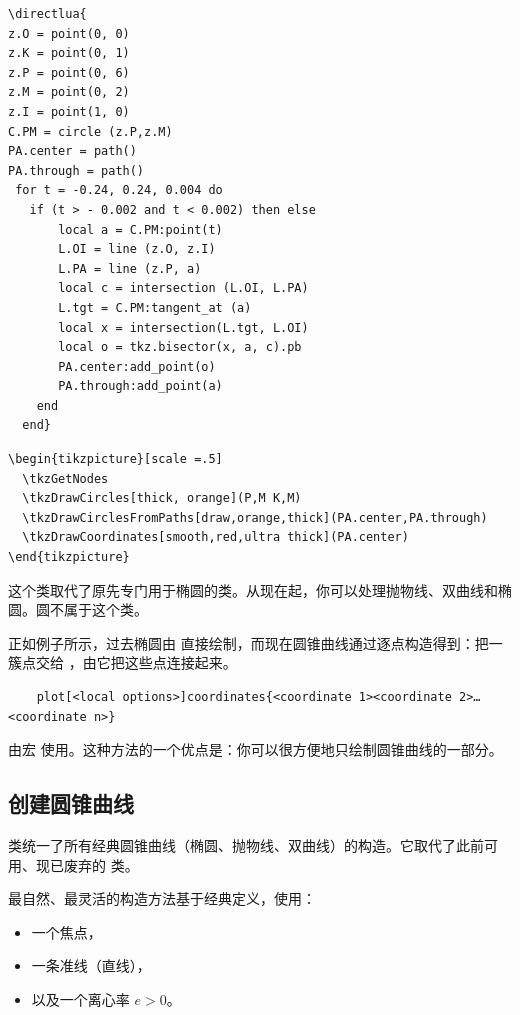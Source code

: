 \begin{verbatim}
\directlua{
z.O = point(0, 0)
z.K = point(0, 1)
z.P = point(0, 6)
z.M = point(0, 2)
z.I = point(1, 0)
C.PM = circle (z.P,z.M)
PA.center = path()
PA.through = path()
 for t = -0.24, 0.24, 0.004 do
   if (t > - 0.002 and t < 0.002) then else
       local a = C.PM:point(t)
       L.OI = line (z.O, z.I)
       L.PA = line (z.P, a)
       local c = intersection (L.OI, L.PA)
       L.tgt = C.PM:tangent_at (a)
       local x = intersection(L.tgt, L.OI)
       local o = tkz.bisector(x, a, c).pb
       PA.center:add_point(o)
       PA.through:add_point(a)
    end
  end}
\end{verbatim}

\begin{verbatim}
\begin{tikzpicture}[scale =.5]
  \tkzGetNodes
  \tkzDrawCircles[thick, orange](P,M K,M)
  \tkzDrawCirclesFromPaths[draw,orange,thick](PA.center,PA.through)
  \tkzDrawCoordinates[smooth,red,ultra thick](PA.center)
\end{tikzpicture}
\end{verbatim}
这个类取代了原先专门用于椭圆的类。从现在起，你可以处理抛物线、双曲线和椭圆。圆不属于这个类。

正如例子所示，过去椭圆由 \TIKZ{} 直接绘制，而现在圆锥曲线通过逐点构造得到：把一簇点交给 \TIKZ{}，由它把这些点连接起来。

\begin{mybox}
  \begin{verbatim}
    plot[<local options>]coordinates{<coordinate 1><coordinate 2>…<coordinate n>}
  \end{verbatim}
\end{mybox}

由宏  使用。这种方法的一个优点是：你可以很方便地只绘制圆锥曲线的一部分。


\subsection{创建圆锥曲线}
\label{sub:creating_a_conic}

 类统一了所有经典圆锥曲线（椭圆、抛物线、双曲线）的构造。它取代了此前可用、现已废弃的  类。

\vspace{1em}
最自然、最灵活的构造方法基于经典定义，使用：
\begin{itemize}
  \item 一个焦点，
  \item 一条准线（直线），
  \item 以及一个离心率 \(e > 0\)。
\end{itemize}

